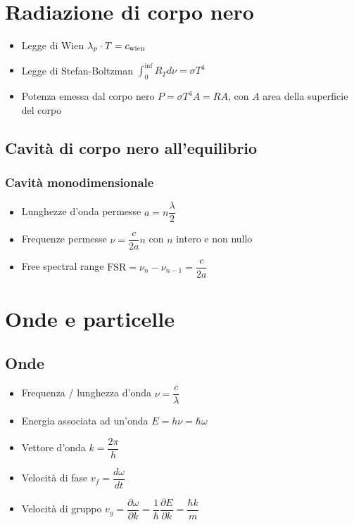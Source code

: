 \documentclass{article}
\begin{document}
\section{Radiazione di corpo nero}
\begin{itemize}
  \item Legge di Wien \( \lambda_{p} \cdot T = c_{\textnormal{wien}} \)
  \item Legge di Stefan-Boltzman \( \displaystyle \int_{0}^{\inf} R_T d \nu = \sigma T ^ 4 \)
  \item Potenza emessa dal corpo nero \( P = \sigma T^4 A = R A \), con \(A\) area della superficie del corpo
\end{itemize}
\subsection{Cavità di corpo nero all'equilibrio}
\subsubsection{Cavità monodimensionale}
\begin{itemize}
  \item Lunghezze d'onda permesse \( a = n \dfrac{\lambda}{2} \)
  \item Frequenze permesse \( \nu = \dfrac{c}{2a} n \) con \( n \) intero e non nullo
  \item Free spectral range \( \text{FSR} = \nu_n - \nu_{n-1} = \dfrac{c}{2a} \)
\end{itemize}

\section{Onde e particelle}
\subsection{Onde}
\begin{itemize}
  \item Frequenza / lunghezza d'onda \( \nu = \dfrac{c}{\lambda} \)
  \item Energia associata ad un'onda \( E = h \nu = \hbar \omega \)
  \item Vettore d'onda \( k = \dfrac{2 \pi}{h} \)
  \item Velocità di fase \( v_f = \dfrac{d \omega}{d t}\)
  \item Velocità di gruppo \( v_g = \dfrac{\partial \omega}{\partial k} = \dfrac{1}{\hbar} \dfrac{\partial E}{\partial k} =\dfrac{\hbar k}{m} \)
\end{itemize}
\end{document}
